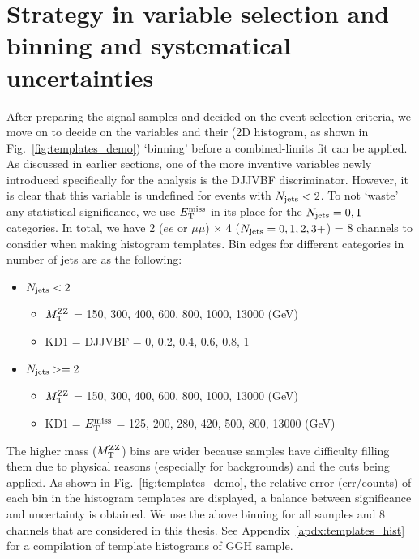 \section{Strategy in variable selection and binning and systematical uncertainties}
After preparing the signal samples and decided on the event selection criteria, we move on to
decide on the variables and their (2D histogram, as shown in Fig.~\ref{fig:templates_demo}) `binning' before a combined-limits
fit can be applied. As discussed in earlier sections, one of the more inventive variables
newly introduced specifically for the analysis is the DJJVBF discriminator. However, it is
clear that this variable is undefined for events with $N_\mathrm{jets} < 2$. To
not `waste' any statistical significance, we use $E_{\mathrm{T}}^{\mathrm{miss}}$ in its place for the
$N_\mathrm{jets} = 0,1$ categories. In total, we have 2 ($ee$ or $\mu\mu$) $\times$ 4 ($N_\mathrm{jets} = 0,1,2,3+$) = 8
channels to consider when making histogram templates.
Bin edges for different categories in number of jets are as the following:
\begin{itemize} 
    \item $N_\mathrm{jets} < 2$
        \begin{itemize} 
            \item $M_\mathrm{T}^{\mathrm{ZZ}}$ = 150, 300, 400, 600, 800, 1000, 13000 (GeV)
            \item KD1 = DJJVBF = 0, 0.2, 0.4, 0.6, 0.8, 1
        \end{itemize}
    \item $N_\mathrm{jets} >= 2$
        \begin{itemize} 
            \item $M_\mathrm{T}^{\mathrm{ZZ}}$ = 150, 300, 400, 600, 800, 1000, 13000 (GeV)
            \item KD1 = $E_{\mathrm{T}}^{\mathrm{miss}}$ = 125, 200, 280, 420, 500, 800, 13000 (GeV)
        \end{itemize}
\end{itemize}
The higher mass ($M_\mathrm{T}^{\mathrm{ZZ}}$) bins are wider because samples
have difficulty filling them due to physical reasons (especially for backgrounds) 
and the cuts being applied. As shown in Fig.~\ref{fig:templates_demo}, the relative error (err/counts) of each
bin in the histogram templates are displayed, a balance between significance and uncertainty is
obtained. We use the above binning for all samples and 8 channels that are considered in this
thesis. See Appendix~\ref{apdx:templates_hist} for a compilation of template histograms of GGH sample.

